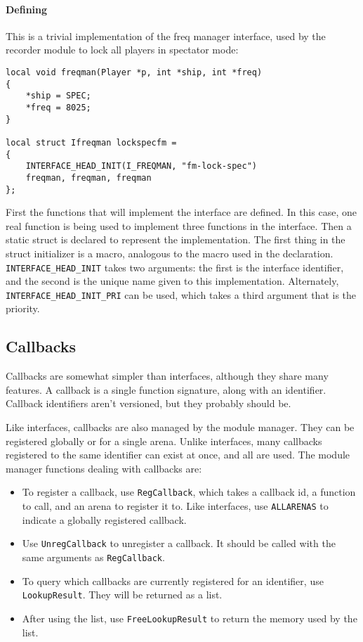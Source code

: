 \documentclass{article}
\begin{document}
\paragraph{Defining}

This is a trivial implementation of the freq manager interface, used by
the recorder module to lock all players in spectator mode:

\begin{verbatim}
local void freqman(Player *p, int *ship, int *freq)
{
    *ship = SPEC;
    *freq = 8025;
}

local struct Ifreqman lockspecfm =
{
    INTERFACE_HEAD_INIT(I_FREQMAN, "fm-lock-spec")
    freqman, freqman, freqman
};
\end{verbatim}

First the functions that will implement the interface are defined. In
this case, one real function is being used to implement three functions
in the interface. Then a static struct is declared to represent the
implementation. The first thing in the struct initializer is a macro,
analogous to the macro used in the declaration.
\verb/INTERFACE_HEAD_INIT/ takes two arguments: the first is the
interface identifier, and the second is the unique name given to this
implementation. Alternately, \verb/INTERFACE_HEAD_INIT_PRI/ can be used,
which takes a third argument that is the priority.


\subsection{Callbacks}

Callbacks are somewhat simpler than interfaces, although they share many
features. A callback is a single function signature, along with an
identifier. Callback identifiers aren't versioned, but they probably
should be.

Like interfaces, callbacks are also managed by the module manager. They
can be registered globally or for a single arena. Unlike interfaces,
many callbacks registered to the same identifier can exist at once, and
all are used. The module manager functions dealing with callbacks are:

\begin{itemize}

\item To register a callback, use \verb/RegCallback/, which takes a
callback id, a function to call, and an arena to register it to. Like
interfaces, use \verb/ALLARENAS/ to indicate a globally registered
callback.

\item Use \verb/UnregCallback/ to unregister a callback. It should be
called with the same arguments as \verb/RegCallback/.

\item To query which callbacks are currently registered for an
identifier, use \verb/LookupResult/. They will be returned as a list.

\item After using the list, use \verb/FreeLookupResult/ to return the
memory used by the list.

\end{itemize}
\end{document}
